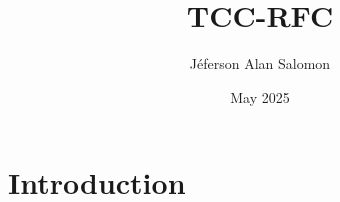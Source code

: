 \documentclass{article}
\title{TCC-RFC}
\author{Jéferson Alan Salomon}
\date{May 2025}
\begin{document}
\maketitle

\section{Introduction}
\end{document}
